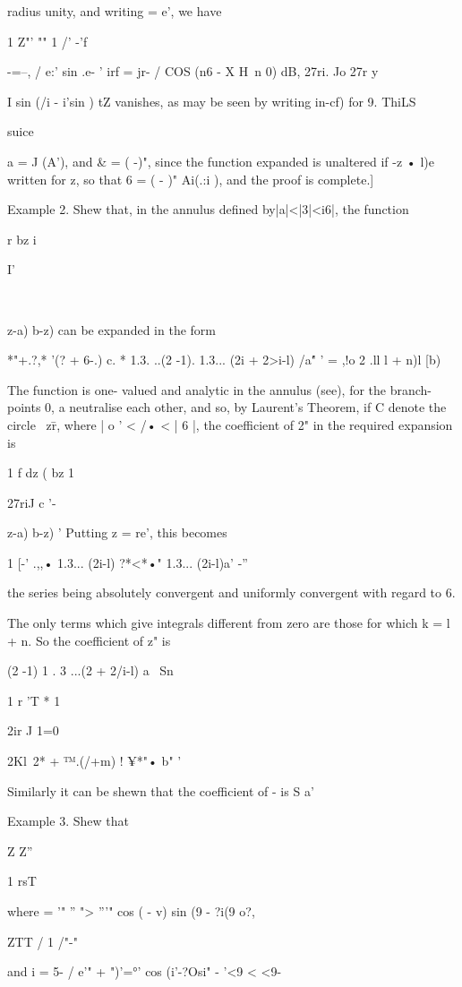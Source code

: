 {{radius unity, and writing = e', we have

1 Z"' "" 1 /' -'f

 -=--, / e:' sin .e- ' irf = jr- / COS (n6 - X H\ n 0) dB, 27ri. Jo
27r y

I sin (/i - i'sin ) tZ vanishes, as may be seen by writing in-cf) for
9. ThiLS

suice

a = J (A'), and \& = ( -)", since the function expanded is unaltered
if -z • l)e written for z, so that 6 = ( - )" Ai(.:i ), and the proof
is complete.]

Example 2. Shew that, in the annulus defined by|a|<|3|<i6|, the
function

r bz i

I'

\ \ {z-a) b-z) can be expanded in the form

*"+.?,* '(? + 6-.) c. * 1.3. ..(2 -1). 1.3... (2i + 2>i-l) /a\' " ' =
,!o 2 .ll l + n)l [b)

The function is one- valued and analytic in the annulus (see),
for the branch-points 0, a neutralise each other, and so, by Laurent's
Theorem, if C denote the circle \ z\=r, where | o ' < /• < | 6 |, the
coefficient of 2" in the required expansion is

1 f dz ( bz 1

27riJ c '- \ \ {z-a) b-z) ' Putting z = re', this becomes

1 [-' .,,• 1.3... (2i-l) ?*<*•" 1.3... (2i-l)a' -''

the series being absolutely convergent and uniformly convergent with
regard to 6.

The only terms which give integrals different from zero are those for
which k = l + n. So the coefficient of z" is

(2 -1) 1 . 3 ...(2 + 2/i-l) a \ Sn

1 r 'T * 1

2ir J 1=0

2Kl\ 2* + ™.(/+m) ! ¥*"• b" '

Similarly it can be shewn that the coefficient of - is S a'\

%
%

Example 3. Shew that

Z Z''

1 rsT

where = '" '' "> '''" cos ( - v) sin (9 - ?i(9 o?,

ZTT / 1 /"-"

and i = 5- / e'" + ")'=°' cos (i'-?Osi" - '<9 < <9-

}}}}
